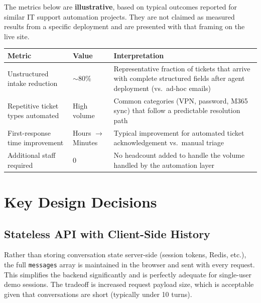 \documentclass[12pt, a4paper]{article}
\newcommand{\inlinecode}[1]{%
  \colorbox{inlinecode!20}{\texttt{\small #1}}%
}
\begin{document}
\begin{notebox}
  The metrics below are \textbf{illustrative}, based on typical outcomes reported for
  similar IT support automation projects. They are not claimed as measured results from
  a specific deployment and are presented with that framing on the live site.
\end{notebox}

\begin{center}
\begin{tabular}{p{4cm}p{3cm}p{6cm}}
\toprule
\textbf{Metric} & \textbf{Value} & \textbf{Interpretation} \\
\midrule
Unstructured intake reduction & $\sim$80\% & Representative fraction of tickets that arrive with complete structured fields after agent deployment (vs.\ ad-hoc emails) \\
Repetitive ticket types automated & High volume & Common categories (VPN, password, M365 sync) that follow a predictable resolution path \\
First-response time improvement & Hours $\to$ Minutes & Typical improvement for automated ticket acknowledgement vs.\ manual triage \\
Additional staff required & 0 & No headcount added to handle the volume handled by the automation layer \\
\bottomrule
\end{tabular}
\end{center}

\section{Key Design Decisions}

\subsection{Stateless API with Client-Side History}

Rather than storing conversation state server-side (session tokens, Redis, etc.), the
full \inlinecode{messages} array is maintained in the browser and sent with every request.
This simplifies the backend significantly and is perfectly adequate for single-user demo
sessions. The tradeoff is increased request payload size, which is acceptable given that
conversations are short (typically under 10 turns).
\end{document}
